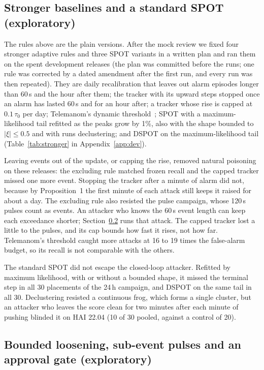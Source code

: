 \documentclass[sigconf,review,anonymous]{acmart}
\begin{document}
\subsection{Stronger baselines and a standard SPOT (exploratory)}
\label{sec:stronger}

The rules above are the plain versions. After the mock review we fixed four stronger adaptive rules and
three SPOT variants in a written plan and ran them on the spent development releases (the plan was
committed before the runs; one rule was corrected by a dated amendment after the first run, and every
run was then repeated). They are daily recalibration that leaves out alarm episodes longer than 60\,s and
the hour after them; the tracker with its upward steps stopped once an alarm has lasted 60\,s and for an
hour after; a tracker whose rise is capped at $0.1\,\tau_0$ per day; Telemanom's dynamic
threshold~\cite{hundman2018telemanom}; SPOT with a maximum-likelihood tail refitted as the peaks grow by
1\%, also with the shape bounded to $|\xi| \le 0.5$ and with runs declustering; and DSPOT on the
maximum-likelihood tail (Table~\ref{tab:stronger} in Appendix~\ref{app:dev}).


Leaving events out of the update, or capping the rise, removed natural poisoning on these releases: the excluding rule matched frozen recall and the capped tracker missed one more event. Stopping the tracker after a minute of alarm did not, because by
Proposition~1 the first minute of each attack still keeps it raised for about a day. The excluding rule
also resisted the pulse campaign, whose 120\,s pulses count as events. An attacker who knows the 60\,s
event length can keep each exceedance shorter; Section~\ref{sec:bounded} runs that attack. The capped tracker lost a little to the pulses, and
its cap bounds how fast it rises, not how far. Telemanom's threshold caught more attacks at 16 to 19 times
the false-alarm budget, so its recall is not comparable with the others.

The standard SPOT did not escape the closed-loop attacker. Refitted by maximum likelihood, with or without
a bounded shape, it missed the terminal step in all 30 placements of the 24\,h campaign, and DSPOT on the
same tail in all 30. Declustering resisted a continuous frog, which forms a single cluster, but an
attacker who leaves the score clean for two minutes after each minute of pushing blinded it on HAI 22.04
(10 of 30 pooled, against a control of 20).

\subsection{Bounded loosening, sub-event pulses and an approval gate (exploratory)}
\label{sec:bounded}
\end{document}
